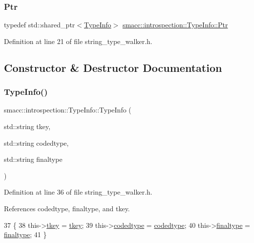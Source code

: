 \subsubsection{\texorpdfstring{Ptr}{Ptr}}
{\footnotesize\ttfamily typedef std\+::shared\+\_\+ptr$<$\hyperlink{classsmacc_1_1introspection_1_1TypeInfo}{Type\+Info}$>$ \hyperlink{classsmacc_1_1introspection_1_1TypeInfo_aa6ffd9c39811d59f7c771941b7fad860}{smacc\+::introspection\+::\+Type\+Info\+::\+Ptr}}



Definition at line 21 of file string\+\_\+type\+\_\+walker.\+h.



\subsection{Constructor \& Destructor Documentation}
\mbox{\label{classsmacc_1_1introspection_1_1TypeInfo_ae57986b3f7e913346a379ec7ad609ffc}} 
\subsubsection{\texorpdfstring{Type\+Info()}{TypeInfo()}}
{\footnotesize\ttfamily smacc\+::introspection\+::\+Type\+Info\+::\+Type\+Info (\begin{DoxyParamCaption}\item[{std\+::string}]{tkey,  }\item[{std\+::string}]{codedtype,  }\item[{std\+::string}]{finaltype }\end{DoxyParamCaption})\hspace{0.3cm}{\ttfamily [inline]}}



Definition at line 36 of file string\+\_\+type\+\_\+walker.\+h.



References codedtype, finaltype, and tkey.


\begin{DoxyCode}
37     \{
38         this->\hyperlink{classsmacc_1_1introspection_1_1TypeInfo_a697dd505119258dba1224d10eea5b2bd}{tkey} = \hyperlink{classsmacc_1_1introspection_1_1TypeInfo_a697dd505119258dba1224d10eea5b2bd}{tkey};
39         this->\hyperlink{classsmacc_1_1introspection_1_1TypeInfo_a117d2b73994b78a6e4e81cdf7054912c}{codedtype} = \hyperlink{classsmacc_1_1introspection_1_1TypeInfo_a117d2b73994b78a6e4e81cdf7054912c}{codedtype};
40         this->\hyperlink{classsmacc_1_1introspection_1_1TypeInfo_aa4010ed427e12db443e08ab16a3de243}{finaltype} = \hyperlink{classsmacc_1_1introspection_1_1TypeInfo_aa4010ed427e12db443e08ab16a3de243}{finaltype};
41     \}
\end{DoxyCode}


